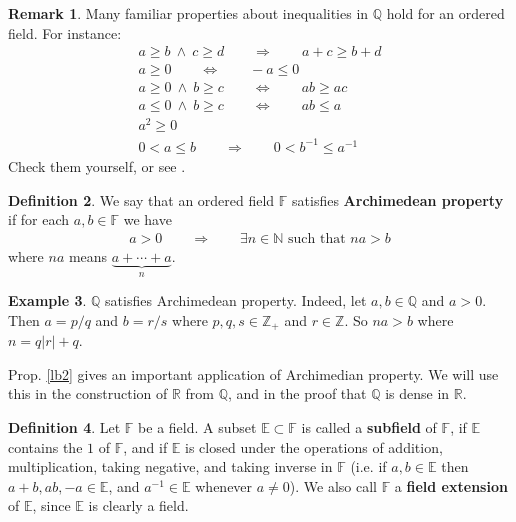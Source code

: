 \documentclass[12pt,b5paper,notitlepage]{article}
\theoremstyle{definition}
\newtheorem{df}{Definition}[section]
\newtheorem{eg}[df]{Example}
\newtheorem{rem}[df]{Remark}
\theoremstyle{plain}
\newcommand{\Nbb}{\mathbb N}
\newcommand{\Zbb}{\mathbb Z}
\newcommand{\Qbb}{\mathbb Q}
\newcommand{\Rbb}{\mathbb R}
\newcommand{\Ebb}{\mathbb E}
\newcommand{\Fbb}{\mathbb F}
\numberwithin{equation}{section}
\begin{document}
\begin{rem}
Many familiar properties about inequalities in $\Qbb$ hold for an ordered field. For instance: 
\begin{gather*}
a\geq b~\wedge~ c\geq d \qquad\Longrightarrow\qquad a+c\geq b+d\\
a\geq0\qquad\Longleftrightarrow\qquad -a\leq0\\
a\geq0~\wedge~b\geq c\qquad\Longleftrightarrow\qquad ab\geq ac\\
a\leq0~\wedge~b\geq c\qquad\Longleftrightarrow\qquad ab\leq a\\
a^2\geq0\\
0<a\leq b\qquad\Longrightarrow\qquad 0< b^{-1}\leq a^{-1}
\end{gather*}
Check them yourself, or see \cite[Prop. 1.18]{Rud-P}.
\end{rem}


\begin{df}
We say that an ordered field $\Fbb$ satisfies  \textbf{Archimedean property} if for each $a,b\in\Fbb$ we have
\begin{align*}
a> 0\qquad\Longrightarrow \qquad\exists n\in\Nbb\text{ such that }na>b
\end{align*}
where $na$ means $\underbrace{a+\cdots+a}_{n}$.
\end{df}

\begin{eg}
$\Qbb$ satisfies Archimedean property. Indeed, let $a,b\in\Qbb$ and $a>0$. Then $a=p/q$ and $b=r/s$ where $p,q,s\in\Zbb_+$ and $r\in\Zbb$. So $na>b$ where $n=q|r|+q$.
\end{eg}



Prop. \ref{lb2} gives an important application of Archimedian property. We will use this in the construction of $\Rbb$ from $\Qbb$, and in the proof that $\Qbb$ is dense in $\Rbb$. 

\begin{df}
Let $\Fbb$ be a field. A subset $\Ebb\subset\Fbb$ is called a  \textbf{subfield}  of $\Fbb$, if $\Ebb$ contains the $1$ of $\Fbb$, and if $\Ebb$ is closed under the operations of addition, multiplication, taking negative, and taking inverse in $\Fbb$ (i.e. if $a,b\in\Ebb$ then $a+b,ab,-a\in\Ebb$, and $a^{-1}\in\Ebb$ whenever $a\neq 0$). We also call $\Fbb$ a  \textbf{field extension} of $\Ebb$, since $\Ebb$ is clearly a field.
\end{df}
\end{document}

